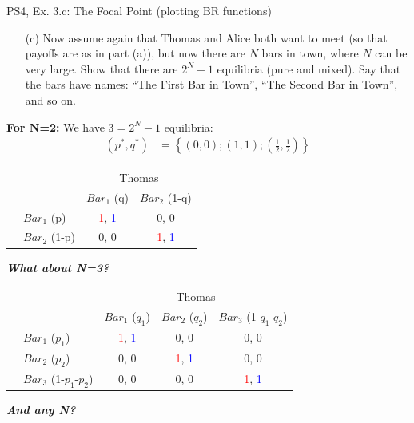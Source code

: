 \begin{frame}{PS4, Ex. 3.c: The Focal Point (plotting BR functions)}
    \begin{itemize}
      \item[(c)] Now assume again that Thomas and Alice both want to meet (so that payoffs are as in part (a)), but now there are $N$ bars in town, where $N$ can be very large. Show that there are $2^N-1$ equilibria (pure and mixed). Say that the bars have names: “The First Bar in Town”, “The Second Bar in Town”, and so on.
    \end{itemize}
  \begin{multicols}{2}
    \textbf{For N=2:} We have $3=2^N-1$ equilibria:
    \begin{align*}
      (p^{*},q^{*})&=\left\{(0,0);(1,1);\left(\frac{1}{2},\frac{1}{2}\right)\right\}
    \end{align*}
  \vfill\null \columnbreak
    \vspace{-12pt}
    \begin{table}
      \begin{tabular}{cl|c|c|}
        & \multicolumn{1}{c}{} & \multicolumn{2}{c}{\color{blue}Thomas}\\
        \parbox[t]{1mm}{}
        &  &  &  \\
        & $Bar_1$ (p) & \textcolor{red}{1}, \textcolor{blue}{1} & 0, 0 \\
        & $Bar_2$ (1-p) & 0, 0 & \textcolor{red}{1}, \textcolor{blue}{1} \\
      \end{tabular}
    \end{table}
  \vfill\null
  \end{multicols}
    \textbf{\textit{What about N=3?}}
    \vspace{-12pt}
    \begin{table}
      \begin{tabular}{cl|c|c|c|}
        & \multicolumn{1}{c}{} & \multicolumn{3}{c}{\color{blue}Thomas}\\
        & \multicolumn{1}{c}{} & \multicolumn{1}{c}{$Bar_1$ ($q_1$)} & \multicolumn{1}{c}{$Bar_2$ ($q_2$)} & \multicolumn{1}{c}{$Bar_3$ (1-$q_1$-$q_2$)} \\\cline{3-5}
        \parbox[t]{1mm}{}
        & $Bar_1$ ($p_1$) & \textcolor{red}{1}, \textcolor{blue}{1} & 0, 0 & 0, 0 \\
        & $Bar_2$ ($p_2$) & 0, 0 & \textcolor{red}{1}, \textcolor{blue}{1} & 0, 0 \\
        & $Bar_3$ (1-$p_1$-$p_2$) & 0, 0 & 0, 0 & \textcolor{red}{1}, \textcolor{blue}{1} \\
      \end{tabular}
    \end{table}
    \textbf{\textit{And any N?}}
\end{frame}
